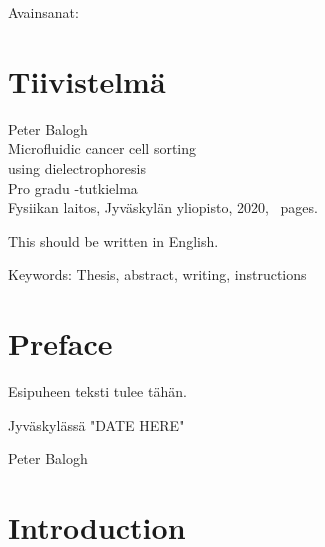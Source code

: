 \documentclass[final]{jyflluk}
\newcommand{\Otsikko}{Microfluidic cancer cell sorting \protect\\ using dielectrophoresis}
\begin{document}
\bigskip

\noindent Avainsanat: 

\section*{Tiivistelmä}

Peter Balogh\\
\Otsikko \\
Pro gradu -tutkielma \\
Fysiikan laitos, Jyväskylän yliopisto, 2020, \pageref{LastPage}~pages.

\bigskip

\begin{otherlanguage}{english}
\noindent This should be written in English.
\end{otherlanguage}

\bigskip 

\noindent Keywords: Thesis, abstract, writing, instructions

\section*{Preface}

Esipuheen teksti tulee tähän.

\bigskip

Jyväskylässä "DATE HERE"

\bigskip

Peter Balogh

\tableofcontents

\section{Introduction}
\label{sec:introduction}
\end{document}
